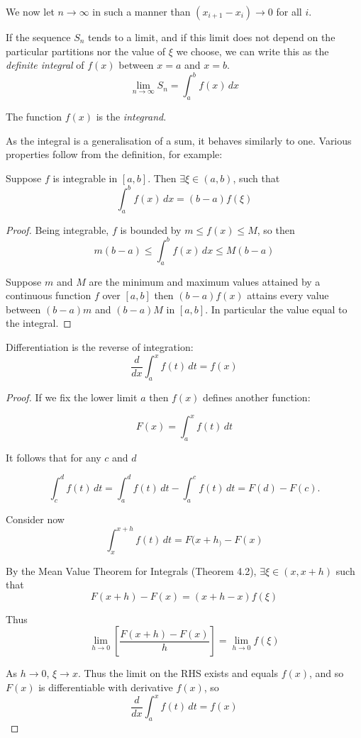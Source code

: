 \documentclass[twoside]{scrartcl}
\begin{document}
We now let $n \to \infty$ in such a manner than $(x_{i+1} - x_i) \to 0$ for all $i$.\\

\begin{definition}If the sequence $S_n$ tends to a limit, and if this limit does not depend on the particular partitions nor the value of $\xi$ we choose, we can write this as the \emph{definite integral} of $f(x)$ between $x=a$ and $x=b$. 
\[\lim_{n \to \infty} S_n = \int_a^b f(x)\, dx\]

The function $f(x)$ is the \emph{integrand}.
\end{definition}
As the integral is a generalisation of a sum, it behaves similarly to one. Various properties follow from the definition, for example: 

\begin{theorem}
	Suppose $f$ is integrable in $[a,b]$. Then $\exists \xi \in (a,b)$, such that 
	 \[\int_a^b f(x)\,dx = (b-a)f(\xi)\]
\end{theorem}

\begin{proof}
Being integrable, $f$ is bounded by $m \leq f(x) \leq M$, so then 
\[m(b-a) \leq \int_a^b f(x)\,dx \leq M(b-a)\]

Suppose $m$ and $M$ are the minimum and maximum values attained by a continuous function $f$ over $[a,b]$ then $(b-a)f(x)$ attains every value between $(b-a)m$ and $(b-a)M$ in $[a,b]$. In particular the value equal to the integral.
\end{proof}



\begin{theorem}
Differentiation is the reverse of integration:
	\[\frac{d}{dx}\int_a^x f(t)\, dt = f(x)\]
\end{theorem}
\begin{proof}
If we fix the lower limit $a$ then $f(x)$ defines another function:

\[F(x) = \int_a^x f(t)\,dt\]

It follows that for any $c$ and $d$

\[\int_c^d f(t)\,dt = \int_a^d f(t)\,dt - \int_a^c f(t)\,dt = F(d) - F(c).\]

Consider now 
\[\int_x^{x+h} f(t)\,dt = F(x+h_) - F(x)\]

By the Mean Value Theorem for Integrals (Theorem 4.2), $\exists \xi \in (x,x+h)$ such that
\[F(x+h) - F(x) = (x+h-x)f(\xi)\]

Thus
\[\lim_{h \to 0}\left[\frac{F(x+h) - F(x)}{h}\right] = \lim_{h \to 0}f(\xi)\]

As $h \to 0$, $\xi \to x$. Thus the limit on the RHS exists and equals $f(x)$, and so $F(x)$ is differentiable with derivative $f(x)$, so
\[\frac{d}{dx}\int_a^x f(t)\, dt = f(x)\]
\end{proof}
\end{document}
